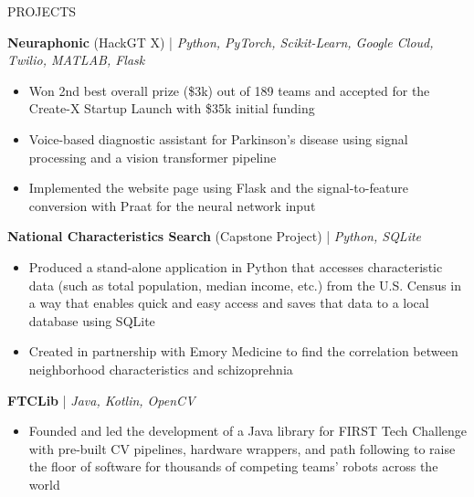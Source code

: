\documentclass{resume} %
\begin{document}
\vspace{-0.8em}
\begin{rSection}{PROJECTS}
\vspace{-1.25em}
\item \textbf{Neuraphonic} (HackGT X) | \textit{Python, PyTorch, Scikit-Learn, Google Cloud, Twilio, MATLAB, Flask}
\vspace{-0.5em}
\begin{itemize}
   \itemsep -5pt {}
   \item Won 2nd best overall prize (\$3k) out of 189 teams and accepted for the Create-X Startup Launch with \$35k
   initial funding
   \item Voice-based diagnostic assistant for Parkinson's disease using signal processing and a vision transformer pipeline
   \item Implemented the website page using Flask and the signal-to-feature conversion with Praat for the neural network input
\end{itemize}
\vspace{-0.5em}
\item \textbf{National Characteristics Search} (Capstone Project) | \textit{Python, SQLite}
\vspace{-0.5em}
\begin{itemize}
   \itemsep -5pt {}
   \item Produced a stand-alone application in Python that accesses characteristic data (such as total population, median income, etc.)
   from the U.S. Census in a way that enables quick and easy access and saves that data to a local database using SQLite
   \item Created in partnership with Emory Medicine to find the correlation between neighborhood characteristics and schizoprehnia
\end{itemize}
\vspace{-0.5em}
\item \textbf{FTCLib} | \textit{Java, Kotlin, OpenCV}
\vspace{-0.5em}
\begin{itemize}
   \itemsep -5pt {}
   \item Founded and led the development of a Java library for FIRST Tech Challenge with pre-built CV pipelines, hardware wrappers, and path following
   to raise the floor of software for thousands of competing teams' robots across the world
\end{itemize}
\end{rSection}
\end{document}
